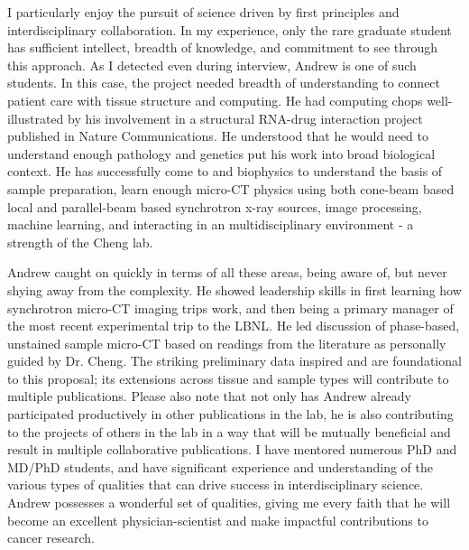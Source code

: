 \documentclass{NIHGrant}
\begin{document}
I particularly enjoy the pursuit of science driven by first principles and interdisciplinary collaboration. In my experience, only the rare graduate student has sufficient intellect, breadth of knowledge, and commitment to see through this approach. As I detected even during interview, Andrew is one of such students. In this case, the project needed breadth of understanding to connect patient care with tissue structure and computing. He had computing chops well-illustrated by his involvement in a structural RNA-drug interaction project published in Nature Communications. He understood that he would need to understand enough pathology and genetics put his work into broad biological context. He has successfully come to and biophysics to understand the basis of sample preparation, learn enough micro-CT physics using both cone-beam based local and parallel-beam based synchrotron x-ray sources, image processing, machine learning, and interacting in an multidisciplinary environment - a strength of the Cheng lab.

Andrew caught on quickly in terms of all these areas, being aware of, but never shying away from the complexity.  He showed leadership skills in first learning how synchrotron micro-CT imaging trips work, and then being a primary manager of the most recent experimental trip to the LBNL. He led discussion of phase-based, unstained sample micro-CT based on readings from the literature as personally guided by Dr. Cheng. The striking preliminary data inspired and are foundational to this proposal; its extensions across tissue and sample types will contribute to multiple publications. Please also note that not only has Andrew already participated productively in other publications in the lab, he is also contributing to the projects of others in the lab in a way that will be mutually beneficial and result in multiple collaborative publications. I have mentored numerous PhD and MD/PhD students, and have significant experience and understanding of the various types of qualities that can drive success in interdisciplinary science. Andrew possesses a wonderful set of qualities, giving me every faith that he will become an excellent physician-scientist and make impactful contributions to cancer research.
\end{document}
